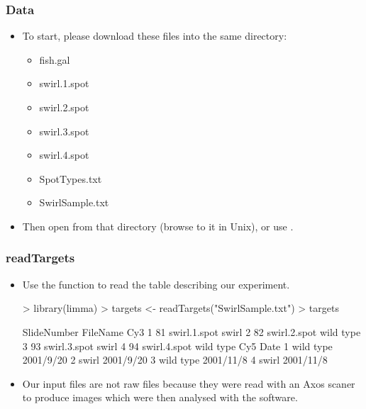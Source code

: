 \begin{frame}[allowframebreaks]
  \frametitle{Data}
  \begin{itemize}
  \item To start, please download these files into the same directory:
  \begin{itemize}
    \item fish.gal
	\item swirl.1.spot
	\item swirl.2.spot
	\item swirl.3.spot
	\item swirl.4.spot
	\item SpotTypes.txt
	\item SwirlSample.txt
  \end{itemize}
  \item Then open  from that directory (browse to it in Unix), or use .
  \end{itemize}
\end{frame}

\begin{frame}
  \frametitle{readTargets}
  \begin{itemize}
  \item Use the function  to read the table describing our experiment.
\begin{Schunk}
\begin{Sinput}
> library(limma)
> targets <- readTargets("SwirlSample.txt")
> targets
\end{Sinput}
\begin{Soutput}
  SlideNumber     FileName       Cy3
1          81 swirl.1.spot     swirl
2          82 swirl.2.spot wild type
3          93 swirl.3.spot     swirl
4          94 swirl.4.spot wild type
        Cy5      Date
1 wild type 2001/9/20
2     swirl 2001/9/20
3 wild type 2001/11/8
4     swirl 2001/11/8
\end{Soutput}
\end{Schunk}
  \item Our input files are not raw files because they were read with an Axos scaner to produce  images which were then analysed with the  software.
  \end{itemize}
\end{frame}

